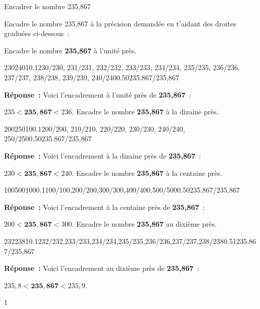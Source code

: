 \documentclass[a4paper,11pt]{report}
\begin{document}
\begin{resolu}{Encadrer le nombre 235,867}{Encadre le nombre 235,867 à la précision demandée en t'aidant des droites graduées ci-dessous~:
\begin{tasks}
\task Encadre le nombre {\bf 235,867} à l'unité près.
\begin{center}
\begin{numberlined}{230}{240}{1}{0.1}{230/230, 231/231, 232/232, 233/233, 234/234, 235/235, 236/236, 237/237, 238/238, 239/239, 240/240}{0.5}{0}{235.867/{235,867}}\end{numberlined}
\end{center}
{\bf Réponse~:} Voici l'encadrement à l'unité près de {\bf 235,867}~: 

$235  < \bm{235,867} < 236.$
\task Encadre le nombre {\bf 235,867} à la dizaine près.
\begin{center}
\begin{numberlined}{200}{250}{10}{0.1}{200/200, 210/210, 220/220, 230/230, 240/240, 250/250}{0.5}{0}{235.867/{235,867}}\end{numberlined}
\end{center}
{\bf Réponse~:} Voici l'encadrement à la dizaine près de {\bf 235,867}~: 

$230  < \bm{235,867} <  240.$
\task Encadre le nombre {\bf 235,867} à la centaine près.
\begin{center}
\begin{numberlined}{100}{500}{100}{0.1}{100/100,200/200,300/300,400/400,500/500}{0.5}{0}{235.867/{235,867}}\end{numberlined}
\end{center}
{\bf Réponse~:} Voici l'encadrement à la centaine près de {\bf 235,867}~: 

$200  < \bm{235,867} <  300.$
\task Encadre le nombre {\bf 235,867} au dixième près.
\begin{center}
\begin{numberlined}{232}{238}{1}{0.1}{232/232,233/233,234/234,235/235,236/236,237/237,238/238}{0.5}{1}{235.867/{235,867}}\end{numberlined}
\end{center}
{\bf Réponse~:} Voici l'encadrement au dixième près de {\bf 235,867}~: 

$235,8  < \bm{235,867} <  235,9.$
\end{tasks}
}{1}
\end{resolu}
\end{document}
